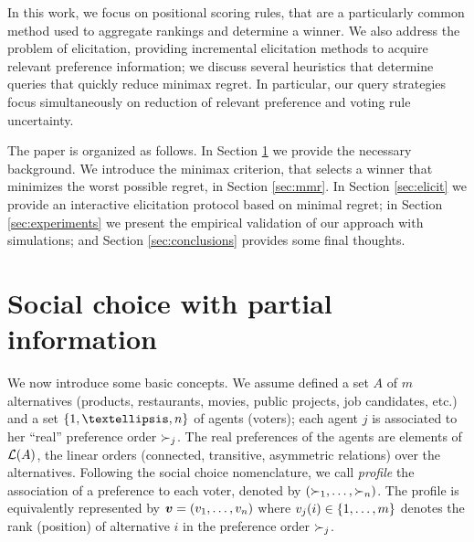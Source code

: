 In this work, we focus on positional scoring rules, that  are a particularly common method used to aggregate rankings and determine a winner.
We also address the problem of elicitation, providing incremental elicitation methods to acquire relevant preference information; we discuss  several heuristics that determine queries that quickly reduce minimax regret.
In particular, our query strategies focus simultaneously on reduction of relevant preference and voting rule uncertainty.

The paper is organized as follows.
In Section \ref{sec:background} we provide the necessary background.
We introduce the minimax criterion, that selects a winner that minimizes the worst possible regret, in Section \ref{sec:mmr}.
In Section \ref{sec:elicit} we provide an interactive elicitation protocol based on minimal regret;  in Section \ref{sec:experiments} we present the empirical validation of our approach with simulations; and Section \ref{sec:conclusions} provides some final thoughts.

\section{Social choice with partial information}
\label{sec:background}
We now introduce some basic concepts.
We assume defined a set $A$ of $m$ alternatives (products, restaurants, movies, public projects, job candidates, etc.) and a set $\set{1, …, n}$ of agents (voters); each agent $j$ is associated to her “real” preference order $\succ_j$.
The real preferences of the agents are elements of $\mathcal{L}(A)$, the linear orders (connected, transitive, asymmetric relations) over the alternatives.
Following the social choice nomenclature, we call {\em profile} the association of a preference to each voter, denoted by $(\succ_1,\ldots,\succ_n)$.
The profile is equivalently represented by $\bm{v}=(v_1,\ldots,v_n)$ where $v_j(i) \in \{1, \ldots, m\}$ denotes the rank (position) of alternative $i$ in the preference order $\succ_j$. 

